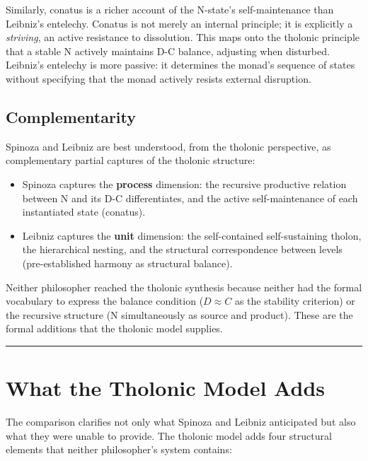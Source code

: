 \documentclass[12pt]{article}
\providecommand{\tightlist}{%
  \setlength{\itemsep}{0pt}\setlength{\parskip}{0pt}}
\begin{document}
Similarly, conatus is a richer account of the N-state's self-maintenance
than Leibniz's entelechy. Conatus is not merely an internal principle;
it is explicitly a \emph{striving}, an active resistance to dissolution.
This maps onto the tholonic principle that a stable N actively maintains
D-C balance, adjusting when disturbed. Leibniz's entelechy is more
passive: it determines the monad's sequence of states without specifying
that the monad actively resists external disruption.

\subsection{Complementarity}\label{complementarity}

Spinoza and Leibniz are best understood, from the tholonic perspective,
as complementary partial captures of the tholonic structure:

\begin{itemize}
\tightlist
\item
  Spinoza captures the \textbf{process} dimension: the recursive
  productive relation between N and its D-C differentiates, and the
  active self-maintenance of each instantiated state (conatus).
\item
  Leibniz captures the \textbf{unit} dimension: the self-contained
  self-sustaining tholon, the hierarchical nesting, and the structural
  correspondence between levels (pre-established harmony as structural
  balance).
\end{itemize}

Neither philosopher reached the tholonic synthesis because neither had
the formal vocabulary to express the balance condition (\(D \approx C\)
as the stability criterion) or the recursive structure (N simultaneously
as source and product). These are the formal additions that the tholonic
model supplies.

\begin{center}\rule{0.5\linewidth}{0.5pt}\end{center}

\section{What the Tholonic Model Adds}\label{what-the-tholonic-model-adds}

The comparison clarifies not only what Spinoza and Leibniz anticipated
but also what they were unable to provide. The tholonic model adds four
structural elements that neither philosopher's system contains:
\end{document}
